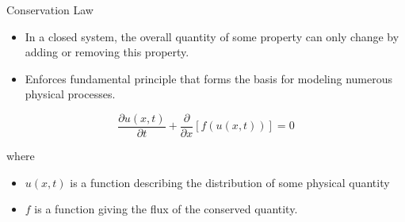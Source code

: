 \documentclass[10pt]{beamer}
\begin{document}
\begin{frame}{Conservation Law}
  \begin{itemize}
    \item  In a closed system, the overall quantity of some property can only change by adding or removing this property. 
    \item Enforces fundamental principle that forms the basis for modeling numerous physical processes. 
  \end{itemize} 

  \begin{equation}
    \frac{\partial u(x,t)}{\partial t} + \frac{\partial}{\partial x}[f(u(x,t))]=0\label{eq:Conservation Law}
  \end{equation}
  
  where 
  \begin{itemize}
    \item $u(x,t)$ is a function describing the distribution of some physical quantity 
    \item $f$ is a function giving the flux of the conserved quantity.
  \end{itemize}

\end{frame}
\end{document}
